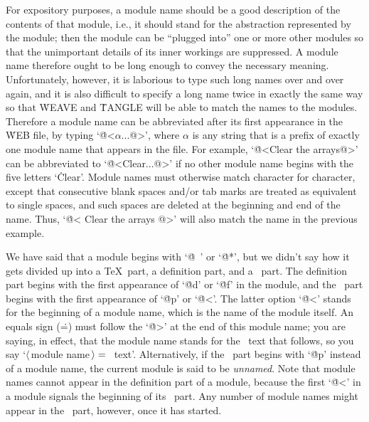 For expository purposes, a module name should be a good description of the
contents of that module, i.e., it should stand for the abstraction
represented by the module; then the module can be ``plugged into'' one or
more other modules so that the unimportant details of its inner workings
are suppressed.  A module name therefore ought to be long enough to convey
the necessary meaning. Unfortunately, however, it is laborious to type
such long names over and over again, and it is also difficult to specify a
long name twice in exactly the same way so that \.{WEAVE} and \.{TANGLE}
will be able to match the names to the modules. Therefore a module name
can be abbreviated after its first appearance in the \.{WEB} file, by
typing `\.{@<$\alpha$...@>}', where $\alpha$ is any string that is a prefix of
exactly one module name that appears in the file. For example, `\.{@<Clear
the arrays@>}' can be abbreviated to `\.{@<Clear...@>}' if no other module
name begins with the five letters `\.{Clear}'. Module names must otherwise
match character for character, except that consecutive blank spaces and/or
tab marks are treated as equivalent to single spaces, and such spaces are
deleted at the beginning and end of the name. Thus, `\.{@< Clear { }the
arrays @>}' will also match the name in the previous example.

We have said that a module begins with `\.{@\ }' or `\.{@*}', but we
didn't say how it gets divided up into a \TeX\ part, a definition part,
and a \PASCAL\ part. The definition part begins with the first appearance
of `\.{@d}' or `\.{@f}' in the module, and the \PASCAL\ part begins with
the first appearance of `\.{@p}' or `\.{@<}'. The latter option `\.{@<}'
stands for the beginning of a module name, which is the name of the module
itself. An equals sign (\.=) must follow the `\.{@>}' at the end of this
module name; you are saying, in effect, that the module name stands for
the \PASCAL\ text that follows, so you say `$\langle\,$module
name$\,\rangle=\null$\PASCAL\ text'. Alternatively, if the \PASCAL\ part
begins with `\.{@p}' instead of a module name, the current module is said
to be {\sl unnamed}. Note that module names cannot appear in the
definition part of a module, because the first `\.{@<}' in a module
signals the beginning of its \PASCAL\ part.  Any number of module names
might appear in the \PASCAL\ part, however, once it has started.

